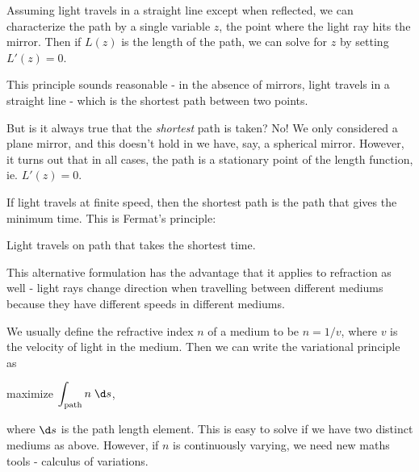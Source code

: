 \documentclass[a4paper]{article}
\begin{document}
Assuming light travels in a straight line except when reflected, we can characterize the path by a single variable $z$, the point where the light ray hits the mirror. Then if $L(z)$ is the length of the path, we can solve for $z$ by setting $L'(z) = 0$.

This principle sounds reasonable - in the absence of mirrors, light travels in a straight line - which is the shortest path between two points.

But is it always true that the \emph{shortest} path is taken? No! We only considered a plane mirror, and this doesn't hold in we have, say, a spherical mirror. However, it turns out that in all cases, the path is a stationary point of the length function, ie. $L'(z) = 0$.

If light travels at finite speed, then the shortest path is the path that gives the minimum time. This is Fermat's principle:
\begin{center}
  Light travels on path that takes the shortest time.
\end{center}
This alternative formulation has the advantage that it applies to refraction as well - light rays change direction when travelling between different mediums because they have different speeds in different mediums.

We usually define the refractive index $n$ of a medium to be $n = 1/v$, where $v$ is the velocity of light in the medium. Then we can write the variational principle as
\begin{center}
  maximize $\displaystyle \int_{\text{path}} n\;\d s$,
\end{center}
where $\d s$ is the path length element. This is easy to solve if we have two distinct mediums as above. However, if $n$ is continuously varying, we need new maths tools - calculus of variations.
\end{document}
